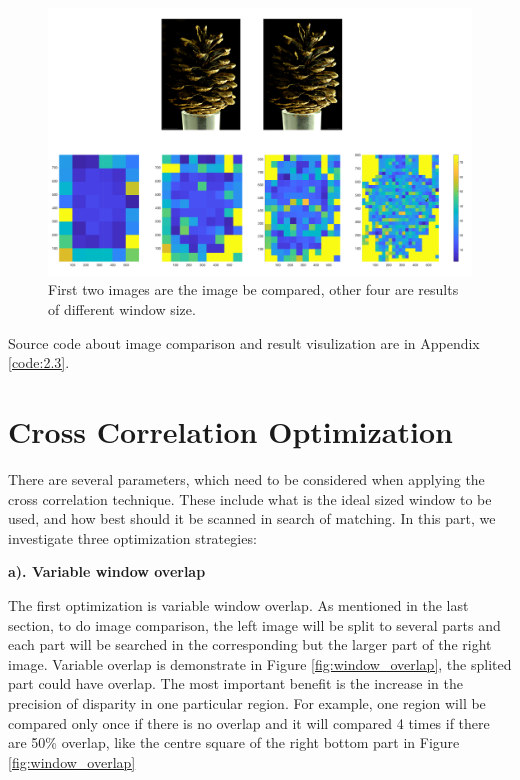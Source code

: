 \begin{figure}[h!]
	\centering
	\includegraphics[width=1\linewidth]{figures/part2/img_cmp1}
	\caption{First two images are the image be compared, other four are results of different window size.}
	\label{fig:img_cmp1}
\end{figure}

Source code about image comparison and result visulization are in Appendix \ref{code:2.3}.

\section{Cross Correlation Optimization}

There are several parameters, which need to be considered when applying the cross correlation technique. These include what is the ideal sized window to be used, and how best should it be scanned in search of matching. In this part, we investigate three optimization strategies:

\textbf{a). Variable window overlap}

The first optimization is variable window overlap. As mentioned in the last section, to do image comparison, the left image will be split to several parts and each part will be searched in the corresponding but the larger part of the right image. Variable overlap is demonstrate in Figure \ref{fig:window_overlap}, the splited part could have overlap. The most important benefit is the increase in the precision of disparity in one particular region. For example, one region will be compared only once if there is no overlap and it will compared 4 times if there are 50\% overlap, like the centre square of the right bottom part in Figure \ref{fig:window_overlap}

